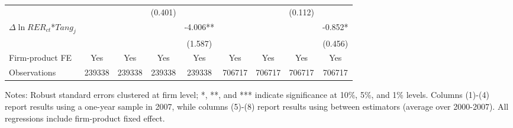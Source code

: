\begin{table}
\begin{threeparttable}
\begin{tabular}{lcccccccc}
			&  &       & (0.401) &       &       &       & (0.112) &  \\
			$\Delta \ln RER_{ct}$*$Tang_{j}$ &   &       &       & -4.006** &       &       &       & -0.852* \\
			&   &       &       & (1.587) &       &       &       & (0.456) \\
                \midrule
			Firm-product FE &  Yes   & Yes   & Yes   & Yes &Yes   & Yes   & Yes   & Yes\\
			Observations & 239338 & 239338 & 239338 & 239338 & 706717 & 706717 & 706717 & 706717 \\
			\bottomrule
		\end{tabular}
		\begin{tablenotes}
			\footnotesize
			\item Notes: Robust standard errors clustered at firm level; *, **, and *** indicate significance at 10\%, 5\%, and 1\% levels. Columns (1)-(4) report results using a one-year sample in 2007, while columns (5)-(8) report results using between estimators (average over 2000-2007). All regressions include firm-product fixed effect.
		\end{tablenotes}
	\end{threeparttable}
	\label{tab.robust.crosec}
\end{table}

